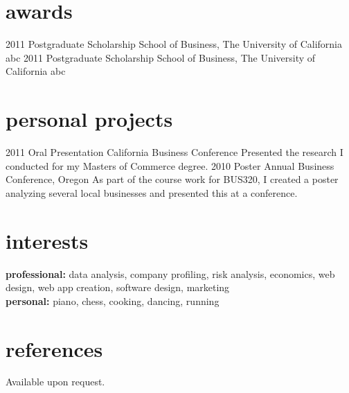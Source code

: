 \documentclass[hidelinks]{kkurucz-cv}
\begin{document}

\section{awards}

\begin{entrylist}
\entry
{2011}
{Postgraduate Scholarship}
{School of Business, The University of California}
{abc}
{\null}
\entry
{2011}
{Postgraduate Scholarship}
{School of Business, The University of California}
{abc}
{\null}
\end{entrylist}


\section{personal projects}
\begin{entrylist}
\entry
{2011}
{Oral Presentation}
{California Business Conference}
{Presented the research I conducted for my Masters of Commerce degree.}
{\null}
\entry
{2010}
{Poster}
{Annual Business Conference, Oregon}
{As part of the course work for BUS320, I created a poster analyzing several local businesses and presented this at a conference.}
{\null}
\end{entrylist}


\section{interests}

\textbf{professional:} data analysis, company profiling, risk analysis, economics, web design, web app creation, software design, marketing
\\
\textbf{personal:} piano, chess, cooking, dancing, running

\section{references}
{Available upon request.}
\end{document}
